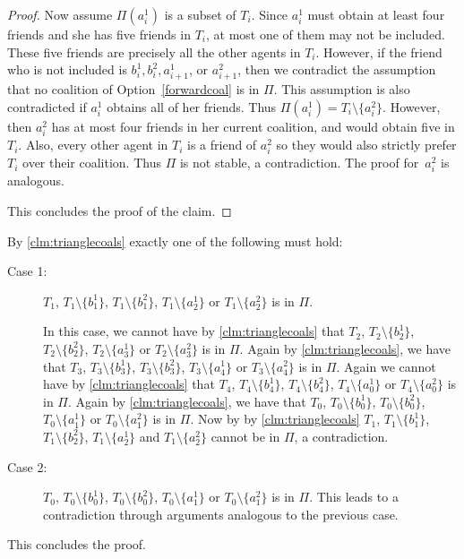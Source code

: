 \documentclass[a4paper,fleqn]{cas-sc}
\newcommand{\partition}{\ensuremath{\Pi}\xspace}
\begin{document}
{\begin{proof}
Now assume $\partition(a^1_{i})$ is a subset of $T_{i}$.
Since $a^1_i$ must obtain at least four friends and she has five friends in $T_i$, at most one of them may not be included. These five friends are precisely all the other agents in $T_i$.
However, if the friend who is not included is $b^1_{i}, b^2_i, a^1_{i+1}$, or $a^2_{i+1}$, then we contradict the assumption that no coalition of Option~\eqref{forwardcoal} is in \partition. This assumption is also contradicted if $a^1_i$ obtains all of her friends. Thus $\partition(a^1_i) = T_i \setminus \{a^2_i\}$. However, then $a^2_i$ has at most four friends in her current coalition, and would obtain five in $T_i$. Also, every other agent in $T_i$ is a friend of $a^2_i$ so they would also strictly prefer $T_i$ over their coalition. Thus \partition is not stable, a contradiction.
The proof for~$a^2_{i}$ is analogous.

This concludes the proof of the claim.
\end{proof}

By \cref{clm:trianglecoals} exactly one of the following must hold:
\begin{description}
\item[Case 1:] $T_1$, $T_1 \setminus \{b^1_1\}$, $T_1 \setminus \{b^2_1\}$, $T_1 \setminus \{a^1_{2}\}$ or $T_1 \setminus \{a^2_{2}\}$ is in \partition.

In this case, we cannot have by \cref{clm:trianglecoals} that $T_2$, $T_2 \setminus \{b^1_2\}$, $T_2 \setminus \{b^2_2\}$, $T_2 \setminus \{a^1_{3}\}$ or $T_2 \setminus \{a^2_{3}\}$ is in \partition.
Again by \cref{clm:trianglecoals}, we have that $T_3$, $T_3 \setminus \{b^1_3\}$, $T_3 \setminus \{b^2_3\}$, $T_3 \setminus \{a^1_{4}\}$ or $T_3 \setminus \{a^2_{4}\}$ is in \partition.
Again we cannot have by \cref{clm:trianglecoals} that $T_4$, $T_4 \setminus \{b^1_4\}$, $T_4 \setminus \{b^2_4\}$, $T_4 \setminus \{a^1_{0}\}$ or $T_4 \setminus \{a^2_{0}\}$ is in \partition.
Again by \cref{clm:trianglecoals}, we have that $T_0$, $T_0 \setminus \{b^1_0\}$, $T_0 \setminus \{b^2_0\}$, $T_0 \setminus \{a^1_{1}\}$ or $T_0 \setminus \{a^2_{1}\}$ is in \partition.
Now by by \cref{clm:trianglecoals} $T_1$, $T_1 \setminus \{b^1_1\}$, $T_1 \setminus \{b^2_2\}$, $T_1 \setminus \{a^1_{2}\}$ and $T_1 \setminus \{a^2_{2}\}$ cannot be in \partition, a contradiction.
\item[Case 2:] $T_{0}$, $T_{0} \setminus \{b^1_{0}\}$, $T_{0} \setminus \{b^2_{0}\}$, $T_{0} \setminus \{a^1_{1}\}$ or $T_{0} \setminus \{a^2_{1}\}$ is in \partition.
This leads to a contradiction through arguments analogous to the previous case.
\end{description}
This concludes the proof.}
\end{document}

